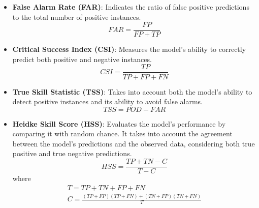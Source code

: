 \begin{itemize}
    \item \textbf{False Alarm Rate (FAR)}: Indicates the ratio of false positive predictions to the total number of positive instances.
    \begin{equation}
        FAR = \frac{FP}{FP + TP}
    \end{equation}

    \item \textbf{Critical Success Index (CSI)}: Measures the model's ability to correctly predict both positive and negative instances.
    \begin{equation}
        CSI = \frac{TP}{TP + FP + FN}
    \end{equation}

    \item \textbf{True Skill Statistic (TSS)}: Takes into account both the model's ability to detect positive instances and its ability to avoid false alarms.
    \begin{equation}
        TSS = POD - FAR
    \end{equation}

    \item \textbf{Heidke Skill Score (HSS)}: Evaluates the model's performance by comparing it with random chance. It takes into account the agreement between the model's predictions and the observed data, considering both true positive and true negative predictions.
    \begin{equation}
        HSS = \frac{TP + TN - C}{T - C}
    \end{equation}
    where
    \begin{subequations}
        \begin{gather*}
            T = TP + TN + FP + FN\\
            C = \frac{(TP+FP)(TP+FN) + (TN+FP)(TN+FN)}{T}
        \end{gather*}
    \end{subequations}
\end{itemize}
